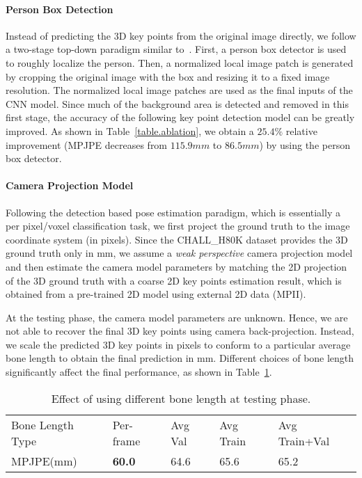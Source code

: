 \documentclass[runningheads]{llncs}
\begin{document}
\paragraph{\textbf{Person Box Detection}} Instead of predicting the 3D key points from the original image directly, we follow a two-stage top-down paradigm similar to~\cite{sun2017integral,papandreou2017towards}. First, a person box detector is used to roughly localize the person. Then, a normalized local image patch is generated by cropping the original image with the box and resizing it to a fixed image resolution. The normalized local image patches are used as the final inputs of the CNN model. Since much of the background area is detected and removed in this first stage, the accuracy of the following key point detection model can be greatly improved. As shown in Table~\ref{table.ablation}, we obtain a $25.4\%$ relative improvement (MPJPE decreases from $115.9 mm$ to $86.5 mm$) by using the person box detector.

\paragraph{\textbf{Camera Projection Model}} 
Following the detection based pose estimation paradigm, which is essentially a per pixel/voxel classification task, we first project the ground truth to the image coordinate system (in pixels). Since the CHALL\_H80K dataset provides the 3D ground truth only in mm, we assume a \emph{weak perspective} camera projection model and then estimate the camera model parameters by matching the 2D projection of the 3D ground truth with a coarse 2D key points estimation result, which is obtained from a pre-trained 2D model using external 2D data (MPII). 

At the testing phase, the camera model parameters are unknown. Hence, we are not able to recover the final 3D key points using camera back-projection. Instead, we scale the predicted 3D key points in pixels to conform to a particular average bone length to obtain the final prediction in mm. Different choices of bone length significantly affect the final performance, as shown in Table~\ref{table.bone_length}. 

\begin{table}
\caption{Effect of using different bone length at testing phase.}
\begin{center}
\begin{tabular}{l | l | l | l | l}
\hline
Bone Length Type& Per-frame & Avg Val 	& Avg Train & Avg Train+Val \\
MPJPE(mm) 	& \textbf{60.0} &  64.6	& 65.6	& 65.2 \\
\hline
\end{tabular}
\end{center}
\label{table.bone_length}
\end{table}
\end{document}
